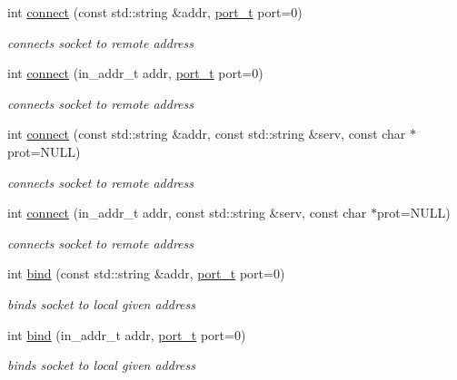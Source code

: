 \begin{CompactItemize}
int \hyperlink{classsocketpp_1_1BaseSocket_769710192256606aaec1a776468d75fa}{connect} (const std::string \&addr, \hyperlink{namespacesocketpp_5517ef80f249b891a2ba64b95fc1e723}{port\_\-t} port=0)
\begin{CompactList}\small\item\em connects socket to remote address \item\end{CompactList}\item 
int \hyperlink{classsocketpp_1_1BaseSocket_2bdd6d459e6f9cf2f71636b01787b250}{connect} (in\_\-addr\_\-t addr, \hyperlink{namespacesocketpp_5517ef80f249b891a2ba64b95fc1e723}{port\_\-t} port=0)
\begin{CompactList}\small\item\em connects socket to remote address \item\end{CompactList}\item 
int \hyperlink{classsocketpp_1_1BaseSocket_eb0f4c84546c22fd9023169701d8fae8}{connect} (const std::string \&addr, const std::string \&serv, const char $\ast$prot=NULL)
\begin{CompactList}\small\item\em connects socket to remote address \item\end{CompactList}\item 
int \hyperlink{classsocketpp_1_1BaseSocket_83666b030a93368675a842a992e0c2af}{connect} (in\_\-addr\_\-t addr, const std::string \&serv, const char $\ast$prot=NULL)
\begin{CompactList}\small\item\em connects socket to remote address \item\end{CompactList}\item 
int \hyperlink{classsocketpp_1_1BaseSocket_78c2a8e6a5c7dfbc708c9cd637e88e51}{bind} (const std::string \&addr, \hyperlink{namespacesocketpp_5517ef80f249b891a2ba64b95fc1e723}{port\_\-t} port=0)
\begin{CompactList}\small\item\em binds socket to local given address \item\end{CompactList}\item 
int \hyperlink{classsocketpp_1_1BaseSocket_d3df73f534900d40f9dff26171ec93b5}{bind} (in\_\-addr\_\-t addr, \hyperlink{namespacesocketpp_5517ef80f249b891a2ba64b95fc1e723}{port\_\-t} port=0)
\begin{CompactList}\small\item\em binds socket to local given address \item\end{CompactList}\item 

\end{CompactItemize}
